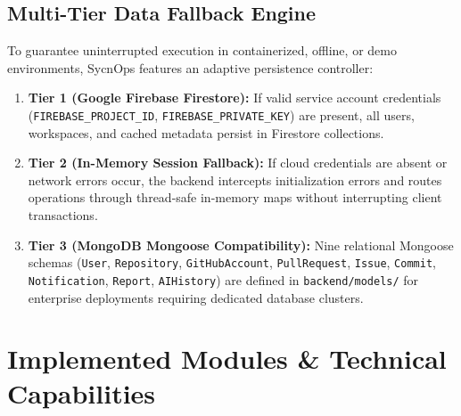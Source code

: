 \documentclass[conference]{IEEEtran}
\begin{document}
\subsection{Multi-Tier Data Fallback Engine}
To guarantee uninterrupted execution in containerized, offline, or demo environments, SycnOps features an adaptive persistence controller:
\begin{enumerate}
    \item \textbf{Tier 1 (Google Firebase Firestore):} If valid service account credentials (\texttt{FIREBASE\_PROJECT\_ID}, \texttt{FIREBASE\_PRIVATE\_KEY}) are present, all users, workspaces, and cached metadata persist in Firestore collections.
    \item \textbf{Tier 2 (In-Memory Session Fallback):} If cloud credentials are absent or network errors occur, the backend intercepts initialization errors and routes operations through thread-safe in-memory maps without interrupting client transactions.
    \item \textbf{Tier 3 (MongoDB Mongoose Compatibility):} Nine relational Mongoose schemas (\texttt{User}, \texttt{Repository}, \texttt{GitHubAccount}, \texttt{PullRequest}, \texttt{Issue}, \texttt{Commit}, \texttt{Notification}, \texttt{Report}, \texttt{AIHistory}) are defined in \texttt{backend/models/} for enterprise deployments requiring dedicated database clusters.
\end{enumerate}

\section{Implemented Modules \& Technical Capabilities}
\end{document}
